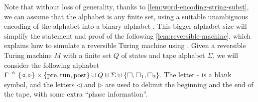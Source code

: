 Note that without loss of generality, thanks to
\cref{lem:word-encoding-string-subst}, we can assume that the alphabet is any
finite set, using a suitable unambiguous encoding of the alphabet into a binary
alphabet \cite{BERST09}. This bigger alphabet size will simplify the statement
and proof of the following \cref{lem:reversible-machine}, which explains how
to simulate a reversible Turing machine using . Given a
reversible Turing machine $M$ with a finite set $Q$ of states and tape alphabet
$\Sigma$, we will consider the following alphabet $\Gamma \triangleq \{ 
\triangleleft, \triangleright  \} \times \{  \text{pre}, \text{run},
\text{post}  \} \uplus Q \uplus \Sigma \uplus \{  \square, \square_1, \square_2 \}$. The letter
$\square$ is a blank symbol, and the letters $\triangleleft$ and
$\triangleright$ are used to delimit the beginning and the end of the tape,
with some extra ``phase information''.

